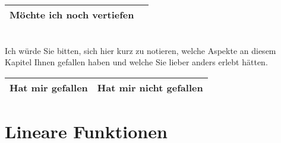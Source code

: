 \documentclass[12pt]{article}
\begin{document}
\begin{tcolorbox}[reflectionbox, width=\linewidth]
\begin{tabularx}{\textwidth}{|X|X|}
\toprule
\textbf{Möchte ich noch vertiefen}\\[6cm]
\bottomrule
\end{tabularx}
\end{tcolorbox}\\
\noindent
Ich würde Sie bitten, sich hier kurz zu notieren, welche Aspekte an diesem Kapitel Ihnen gefallen haben und welche Sie lieber anders erlebt hätten.\\
\begin{tcolorbox}[reflectionbox, width=\linewidth]
\begin{tabularx}{\textwidth}{|X|X|}
\toprule
\textbf{Hat mir gefallen} & \textbf{Hat mir nicht gefallen}\\[5cm]
\bottomrule
\end{tabularx}
\end{tcolorbox}

\newpage
\section{Lineare Funktionen}
\end{document}
